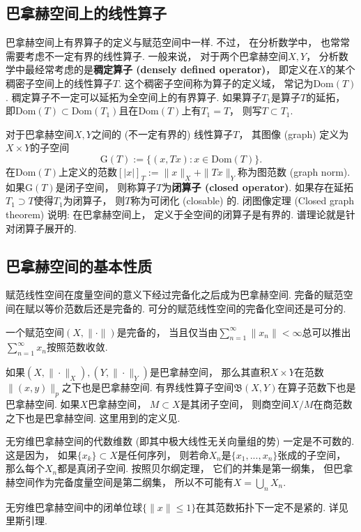 \subsection{巴拿赫空间上的线性算子}
巴拿赫空间上有界算子的定义与赋范空间中一样. 不过， 在分析数学中， 也常常需要考虑不一定有界的线性算子. 一般来说， 对于两个巴拿赫空间$X,Y$， 分析数学中最经常考虑的是\textbf{稠定算子 (densely defined operator)}， 即定义在$X$的某个稠密子空间上的线性算子$T$. 这个稠密子空间称为算子的定义域， 常记为$\text{Dom}(T)$. 稠定算子不一定可以延拓为全空间上的有界算子. 如果算子$T_1$是算子$T$的延拓， 即$\text{Dom}(T)\subset \text{Dom}(T_1)$且在$\text{Dom}(T)$上有$T_1=T$， 则写$T\subset T_1$.

对于巴拿赫空间$X,Y$之间的 (不一定有界的) 线性算子$T$， 其图像 (graph) 定义为$X\times Y$的子空间
$$
\text{G}(T):=\{(x,Tx):x\in \text{Dom}(T)\}.
$$
在$\text{Dom}(T)$上定义的范数$[|x|]_T:=\|x\|_X+\|Tx\|_Y$称为图范数 (graph norm). 如果$\text{G}(T)$是闭子空间， 则称算子$T$为\textbf{闭算子 (closed operator)}. 如果存在延拓$T_1\supset T$使得$T_1$为闭算子， 则$T$称为可闭化 (closable) 的. 闭图像定理 (Closed graph theorem) 说明: 在巴拿赫空间上， 定义于全空间的闭算子是有界的. 谱理论就是针对闭算子展开的.

\subsection{巴拿赫空间的基本性质}
赋范线性空间在度量空间的意义下经过完备化之后成为巴拿赫空间. 完备的赋范空间在赋以等价范数后还是完备的. 可分的赋范线性空间的完备化空间还是可分的. 

一个赋范空间$(X,\|\cdot\|)$是完备的， 当且仅当由$\sum _{n=1}^{\infty }\|x_{n}\|<\infty $总可以推出$\sum _{n=1}^{\infty }x_{n}$按照范数收敛.

如果$(X,\|\cdot\|_X),(Y,\|\cdot\|_Y)$是巴拿赫空间， 那么其直积$X\times Y$在范数$\|(x,y)\|_{p}$之下也是巴拿赫空间. 有界线性算子空间$\mathfrak{B}(X,Y)$在算子范数下也是巴拿赫空间. 如果$X$巴拿赫空间， $M\subset X$是其闭子空间， 则商空间$X/M$在商范数之下也是巴拿赫空间. 这里用到的定义见.

无穷维巴拿赫空间的代数维数 (即其中极大线性无关向量组的势) 一定是不可数的. 这是因为， 如果$\{x_k\}\subset X$是任何序列， 则若命$X_n$是$\{x_1,...,x_n\}$张成的子空间， 那么每个$X_n$都是真闭子空间. 按照贝尔纲定理， 它们的并集是第一纲集， 但巴拿赫空间作为完备度量空间是第二纲集， 所以不可能有$X=\bigcup_n X_n$.

无穷维巴拿赫空间中的闭单位球$\{\|x\|\leq1\}$在其范数拓扑下一定不是紧的. 详见里斯引理.
